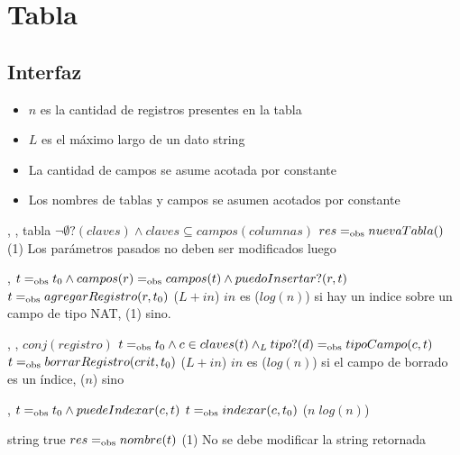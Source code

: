 \section{Tabla}

\subsection{Interfaz}

\iusa{}

\ioperaciones

\begin{itemize}
    \item{$n$ es la cantidad de registros presentes en la tabla}
    \item{$L$ es el máximo largo de un dato string}
    \item{La cantidad de campos se asume acotada por constante}
    \item{Los nombres de tablas y campos se asumen acotados por constante}
\end{itemize}

{   ,
    ,
    } %
{tabla} %
{$\neg\emptyset?(claves) \land claves \subseteq campos(columnas)$} %
{$res =_{\mathrm{obs}} nuevaTabla()$} %
{\bigo(1)} %
{Los parámetros pasados no deben ser modificados luego} %
{} %

{   ,
    }
{}
{$t =_{\mathrm{obs}} t_0 \land campos(r) =_{\mathrm{obs}} campos(t) \land puedoInsertar?(r,t)$}
{$t =_{\mathrm{obs}} agregarRegistro(r,t_0)$}
{\bigo($L + in$)}
{}
{$in$ es \bigo($log(n)$) si hay un indice sobre un campo de tipo NAT, \bigo(1) sino. \\
 }

{   ,
    ,
    }
{$conj(registro)$}
{$t =_{\mathrm{obs}} t_0 \land c \in claves(t) \land_L tipo?(d) =_{\mathrm{obs}} tipoCampo(c,t)$}
{$t =_{\mathrm{obs}} borrarRegistro(crit,t_0)$}
{\bigo($L + in$)}
{}
{$in$ es \bigo($log(n)$) si el campo de borrado es un índice, \bigo($n$) sino}

{   ,
    }
{}
{$t =_{\mathrm{obs}} t_0 \land puedeIndexar(c,t)$}
{$t =_{\mathrm{obs}} indexar(c,t_0)$}
{\bigo($n \; log(n)$)}
{}
{}

{   }
{string}
{true}
{$res =_{\mathrm{obs}} nombre(t)$}
{\bigo(1)}
{No se debe modificar la string retornada}
{}

